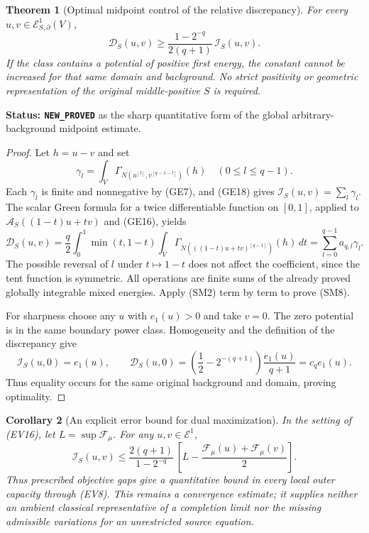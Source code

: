 \documentclass[11pt,a4paper]{article}
\numberwithin{equation}{section}
\newtheorem{theorem}{Theorem}[section]
\newtheorem{corollary}[theorem]{Corollary}
\theoremstyle{definition}
\theoremstyle{remark}
\begin{document}
\begin{theorem}[Optimal midpoint control of the relative discrepancy]
\label{thm:r11-sharp-midpoint-modulus}
For every $u,v\in\mathcal E^1_{S,\partial}(V)$,
\[
 \boxed{\qquad
       \mathscr D_S(u,v)\geq
          \frac{1-2^{-q}}{2(q+1)}\,\mathscr I_S(u,v).
       \qquad}
 \tag{SM8}
\]
If the class contains a potential of positive first
energy, the constant cannot be increased for that
same domain and background.
No strict positivity or geometric representation of
the original middle-positive $S$ is required.
\end{theorem}

\noindent\textbf{Status: \texttt{NEW\_PROVED}}
as the sharp quantitative form of the global
arbitrary-background midpoint estimate.

\begin{proof}
Let $h=u-v$ and set
\[
 \gamma_l=
       \int_V\Gamma_{N(u^{[l]},v^{[q-1-l]})}(h)
                      \quad(0\leq l\leq q-1).
 \tag{SM9}
\]
Each $\gamma_l$ is finite and nonnegative by (GE7),
and (GE18) gives
$\mathscr I_S(u,v)=\sum_l\gamma_l$.
The scalar Green formula for a twice differentiable
function on $[0,1]$, applied to
$\mathscr A_S((1-t)u+tv)$ and (GE16), yields
\[
 \mathscr D_S(u,v)=
       \frac q2\int_0^1\min(t,1-t)
          \int_V\Gamma_{N(((1-t)u+tv)^{[q-1]})}(h)\,dt
       =\sum_{l=0}^{q-1}a_{q,l}\gamma_l .
 \tag{SM10}
\]
The possible reversal of $l$ under $t\mapsto1-t$
does not affect the coefficient, since the tent
function is symmetric.
All operations are finite sums of the already
proved globally integrable mixed energies.
Apply (SM2) term by term to prove (SM8).

For sharpness choose any $u$ with $e_1(u)>0$ and
take $v=0$.  The zero potential is in the same
boundary power class.  Homogeneity and the definition
of the discrepancy give
\[
 \mathscr I_S(u,0)=e_1(u),\qquad
 \mathscr D_S(u,0)
    =\left(\frac12-2^{-(q+1)}\right)
                       \frac{e_1(u)}{q+1}
    =c_q e_1(u).
 \tag{SM11}
\]
Thus equality occurs for the same original background
and domain, proving optimality.
\end{proof}

\begin{corollary}[An explicit error bound for dual maximization]
\label{cor:r11-sharp-maximizing-error}
In the setting of (EV16), let
$L=\sup\mathcal F_\mu$.
For any $u,v\in\mathcal E^1$,
\[
 \mathscr I_S(u,v)
       \leq \frac{2(q+1)}{1-2^{-q}}\,
                \left[L-\frac{\mathcal F_\mu(u)+\mathcal F_\mu(v)}2\right].
 \tag{SM12}
\]
Thus prescribed objective gaps give a quantitative
bound in every local outer capacity through (EV8).
This remains a convergence estimate; it supplies
neither an ambient classical representative of
a completion limit nor the missing admissible
variations for an unrestricted source equation.
\end{corollary}
\end{document}
